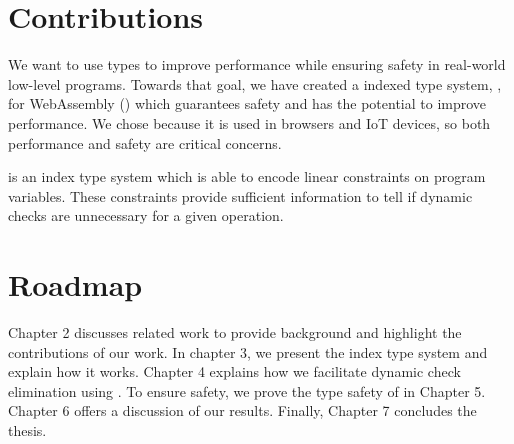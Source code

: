 \section{Contributions}
We want to use types to improve performance while ensuring safety in real-world low-level programs.
Towards that goal, we have created a indexed type system, \name, for WebAssembly (\wasm) which guarantees safety and has the potential to improve performance.
We chose \wasm because it is used in browsers and IoT devices, so both performance and safety are critical concerns.

\name is an index type system which is able to encode linear constraints on program variables.
These constraints provide sufficient information to tell if dynamic checks are unnecessary for a given operation.

\section{Roadmap}
Chapter 2 discusses related work to provide background and highlight the contributions of our work.
In chapter 3, we present the \name index type system and explain how it works.
Chapter 4 explains how we facilitate dynamic check elimination using \name.
To ensure safety, we prove the type safety of \name in Chapter 5.
Chapter 6 offers a discussion of our results.
Finally, Chapter 7 concludes the thesis.
